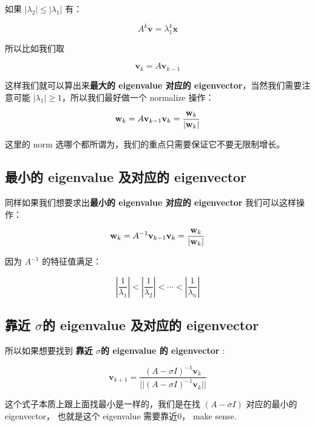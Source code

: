 \documentclass[
]{book}
\begin{document}
如果 \(|\lambda_2| \le |\lambda_1|\) 有：

\[A^k \mathbf{v} = \lambda_1^k \mathbf{x}\]

所以比如我们取

\[\mathbf{v}_k = A \mathbf{v}_{k-1}\]

这样我们就可以算出来\textbf{最大的 eigenvalue 对应的 eigenvector}，当然我们需要注意可能 \(|\lambda_1| \ge 1\)，所以我们最好做一个 normalize 操作：

\[\mathbf{w}_k = A \mathbf{v}_{k-1}\\
\mathbf{v}_k = \frac{\mathbf{w}_k}{|\mathbf{w}_k|}
\]

这里的 norm 选哪个都所谓为，我们的重点只需要保证它不要无限制增长。

\hypertarget{ux6700ux5c0fux7684-eigenvalue-ux53caux5bf9ux5e94ux7684-eigenvector}{%
\subsection{最小的 eigenvalue 及对应的 eigenvector}\label{ux6700ux5c0fux7684-eigenvalue-ux53caux5bf9ux5e94ux7684-eigenvector}}

同样如果我们想要求出\textbf{最小的 eigenvalue 对应的 eigenvector} 我们可以这样操作：

\[\mathbf{w}_k = A^{-1} \mathbf{v}_{k-1}\\
\mathbf{v}_k = \frac{\mathbf{w}_k}{|\mathbf{w}_k|}
\]

因为 \(A^{-1}\) 的特征值满足：

\[|\frac{1}{\lambda_1}|  < |\frac{1}{\lambda_2}| < \cdots <|\frac{1}{\lambda_n}| \]

\hypertarget{ux9760ux8fd1-sigmaux7684-eigenvalue-ux53caux5bf9ux5e94ux7684-eigenvector}{%
\subsection{\texorpdfstring{靠近 \(\sigma\)的 eigenvalue 及对应的 eigenvector}{靠近 \textbackslash sigma的 eigenvalue 及对应的 eigenvector}}\label{ux9760ux8fd1-sigmaux7684-eigenvalue-ux53caux5bf9ux5e94ux7684-eigenvector}}

所以如果想要找到 \textbf{靠近 \(\sigma\)的 eigenvalue 的 eigenvector} :

\[\mathbf{v}_{k+1} = \frac{(A - \sigma I)^{-1} \mathbf{v}_k}{||(A - \sigma I)^{-1}\mathbf{v}_k||} \]

这个式子本质上跟上面找最小是一样的，我们是在找 \((A - \sigma I)\) 对应的最小的 eigenvector， 也就是这个 eigenvalue 需要靠近0， make sense.
\end{document}
